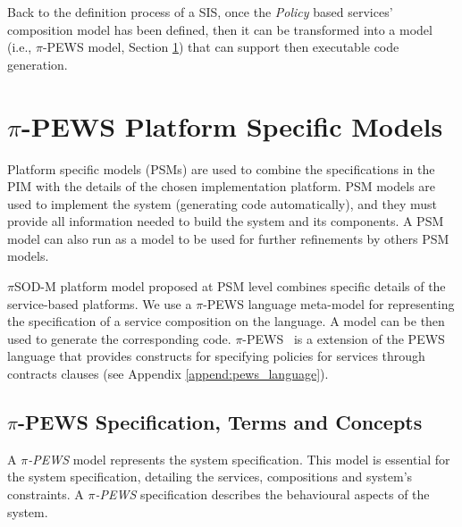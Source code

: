 Back to the  definition process of a SIS, once the {\em Policy} based services'
composition model has been defined, then it can be transformed into a model
(i.e., $\pi$-PEWS model, Section \ref{sec:psm-pisodm}) that can support then
executable code generation. 


\section{$\pi$-PEWS Platform Specific Models}
\label{sec:psm-pisodm}



Platform specific models (PSMs) are used to combine the specifications in
the PIM with the details of the chosen implementation platform. PSM
models are used to implement the system (generating code automatically), and
they must provide all information needed to build the system and its
components. A PSM model can also run as a model to be used for further
refinements by others PSM models.


$\pi$SOD-M platform model proposed at PSM level combines
specific details of the service-based platforms. We use a $\pi$-PEWS language
meta-model for representing the specification of a service composition on the
language. A model can be then used to generate the corresponding code.
$\pi$-PEWS~\cite{Placido2010LTPD} is a extension of the PEWS language that
provides constructs for specifying policies for services through contracts clauses (see Appendix \ref{append:pews_language}).


\subsection{$\pi$-PEWS Specification, Terms and Concepts}

 A \textit{$\pi$-PEWS} model represents the system
 specification. This model is essential for the system specification,
 detailing the services, compositions and system's constraints. A
 \textit{$\pi$-PEWS} specification describes the behavioural aspects of the
 system.
 
